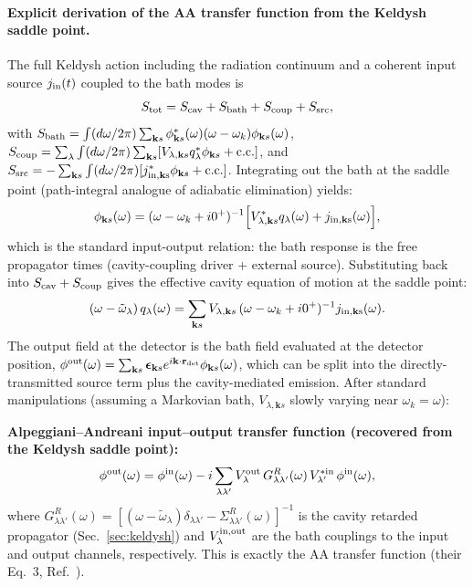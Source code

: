 \documentclass[12pt]{article}
\newcommand{\tomega}{\tilde{\omega}}
\begin{document}
\paragraph{Explicit derivation of the AA transfer function from the
Keldysh saddle point.}  The full Keldysh action including the
radiation continuum and a coherent input source $j_{\rm in}(t)$
coupled to the bath modes is
\begin{equation}
  S_{\rm tot} = S_{\rm cav} + S_{\rm bath} + S_{\rm coup} + S_{\rm src},
\end{equation}
with
$S_{\rm bath} = \int(d\omega/2\pi)\sum_{\mathbf{k}s}
\phi^*_{\mathbf{k}s}(\omega)(\omega-\omega_k)\phi_{\mathbf{k}s}(\omega)$,
$S_{\rm coup} = \sum_\lambda\int(d\omega/2\pi)\sum_{\mathbf{k}s}
[V_{\lambda,\mathbf{k}s}q^*_\lambda\phi_{\mathbf{k}s}+\text{c.c.}]$,
and $S_{\rm src} = -\sum_{\mathbf{k}s}\int(d\omega/2\pi)
[j^*_{\rm in,\mathbf{k}s}\phi_{\mathbf{k}s}+\text{c.c.}]$.
Integrating out the bath at the saddle point (path-integral analogue of
adiabatic elimination) yields:
\begin{equation}
  \phi_{\mathbf{k}s}(\omega) = (\omega-\omega_k+i0^+)^{-1}
  \Bigl[V^*_{\lambda,\mathbf{k}s}q_\lambda(\omega) + j_{\rm in,\mathbf{k}s}(\omega)\Bigr],
\end{equation}
which is the standard input-output relation: the bath response is the
free propagator times (cavity-coupling driver + external source).
Substituting back into $S_{\rm cav} + S_{\rm coup}$ gives the
effective cavity equation of motion at the saddle point:
\begin{equation}
  (\omega - \tomega_\lambda)\,q_\lambda(\omega)
  = \sum_{\mathbf{k}s}V_{\lambda,\mathbf{k}s}\,(\omega-\omega_k+i0^+)^{-1}
    j_{\rm in,\mathbf{k}s}(\omega).
\end{equation}
The output field at the detector is the bath field evaluated at the
detector position, $\phi^{\rm out}(\omega) = \sum_{\mathbf{k}s}\boldsymbol{\epsilon}_{\mathbf{k}s}
e^{i\mathbf{k}\cdot\mathbf{r}_{\rm det}}\phi_{\mathbf{k}s}(\omega)$, which
can be split into the directly-transmitted source term plus the
cavity-mediated emission.  After standard manipulations (assuming a
Markovian bath, $V_{\lambda,\mathbf{k}s}$ slowly varying near $\omega_k=
\omega$):
\begin{keyresult}
\textbf{Alpeggiani--Andreani input--output transfer function (recovered
from the Keldysh saddle point):}
\begin{equation}
  \phi^{\rm out}(\omega) = \phi^{\rm in}(\omega)
  - i\sum_{\lambda\lambda'}V^{\rm out}_\lambda
    \,G^R_{\lambda\lambda'}(\omega)\,V^{*\rm in}_{\lambda'}\,\phi^{\rm in}(\omega),
  \label{eq:AA_transfer}
\end{equation}
where $G^R_{\lambda\lambda'}(\omega) = [(\omega - \tomega_\lambda)\delta_{\lambda\lambda'}
- \Sigma^R_{\lambda\lambda'}(\omega)]^{-1}$ is the cavity retarded
propagator (Sec.~\ref{sec:keldysh}) and $V^{\rm in,out}_\lambda$ are
the bath couplings to the input and output channels, respectively.
This is exactly the AA transfer function (their Eq.~3,
Ref.~\cite{Alpeggiani2015}).
\end{keyresult}
\end{document}

